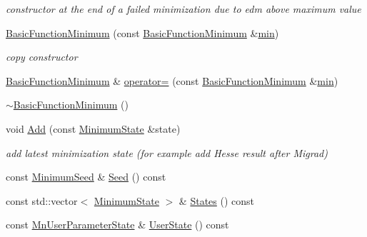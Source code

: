 \begin{DoxyCompactItemize}
\begin{DoxyCompactList}\small\item\em constructor at the end of a failed minimization due to edm above maximum value \end{DoxyCompactList}\item 
\mbox{\hyperlink{classROOT_1_1Minuit2_1_1BasicFunctionMinimum_ae0812dcb933989ffd9e096792367d0b7}{Basic\+Function\+Minimum}} (const \mbox{\hyperlink{classROOT_1_1Minuit2_1_1BasicFunctionMinimum}{Basic\+Function\+Minimum}} \&\mbox{\hyperlink{adat__devel_2lib_2SU3_2SU3__internal_8h_ab0f5fed3171eb00d1c5f037d9f518a23}{min}})
\begin{DoxyCompactList}\small\item\em copy constructor \end{DoxyCompactList}\item 
\mbox{\hyperlink{classROOT_1_1Minuit2_1_1BasicFunctionMinimum}{Basic\+Function\+Minimum}} \& \mbox{\hyperlink{classROOT_1_1Minuit2_1_1BasicFunctionMinimum_ad143c1c314e041649151bac9bb9e7a91}{operator=}} (const \mbox{\hyperlink{classROOT_1_1Minuit2_1_1BasicFunctionMinimum}{Basic\+Function\+Minimum}} \&\mbox{\hyperlink{adat__devel_2lib_2SU3_2SU3__internal_8h_ab0f5fed3171eb00d1c5f037d9f518a23}{min}})
\item 
\mbox{\hyperlink{classROOT_1_1Minuit2_1_1BasicFunctionMinimum_a8ed0b5582b668d53022197f2540df4e7}{$\sim$\+Basic\+Function\+Minimum}} ()
\item 
void \mbox{\hyperlink{classROOT_1_1Minuit2_1_1BasicFunctionMinimum_abd32f932e7a26883723b33c4a1402a85}{Add}} (const \mbox{\hyperlink{classROOT_1_1Minuit2_1_1MinimumState}{Minimum\+State}} \&state)
\begin{DoxyCompactList}\small\item\em add latest minimization state (for example add Hesse result after Migrad) \end{DoxyCompactList}\item 
const \mbox{\hyperlink{classROOT_1_1Minuit2_1_1MinimumSeed}{Minimum\+Seed}} \& \mbox{\hyperlink{classROOT_1_1Minuit2_1_1BasicFunctionMinimum_a925aba07b861d7b3d1e5386411a5ea2f}{Seed}} () const
\item 
const std\+::vector$<$ \mbox{\hyperlink{classROOT_1_1Minuit2_1_1MinimumState}{Minimum\+State}} $>$ \& \mbox{\hyperlink{classROOT_1_1Minuit2_1_1BasicFunctionMinimum_a89080776340dc1cad0d73357a6c4b401}{States}} () const
\item 
const \mbox{\hyperlink{classROOT_1_1Minuit2_1_1MnUserParameterState}{Mn\+User\+Parameter\+State}} \& \mbox{\hyperlink{classROOT_1_1Minuit2_1_1BasicFunctionMinimum_ac1757a094afe32c23b548fafaff5acc1}{User\+State}} () const

\end{DoxyCompactItemize}
